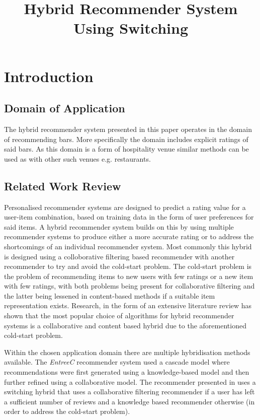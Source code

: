 \documentclass[conference]{IEEEtran}
\begin{document}
\title{Hybrid Recommender System Using Switching}

\author{
}
\maketitle

\section{Introduction}
\subsection{Domain of Application}
The hybrid recommender system presented in this paper operates in the domain of recommending bars. More specifically the domain includes explicit ratings of said bars. As this domain is a form of hospitality venue similar methods can be used as with other such venues e.g. restaurants\cite{b1}.
\subsection{Related Work Review}
Personalised recommender systems are designed to predict a rating value for a user-item combination, based on training data in the form of user preferences for said items\cite{b2}. A hybrid recommender system builds on this by using multiple recommender systems to produce either a more accurate rating or to address the shortcomings of an individual recommender system\cite{b3}. Most commonly this hybrid is designed using a colloborative filtering based recommender with another recommender to try and avoid the cold-start problem\cite{b4}. The cold-start problem is the problem of recommending items to new users with few ratings or a new item with few ratings\cite{b5}, with both problems being present for collaborative filtering and the latter being lessened in content-based methods if a suitable item representation exists\cite{b4}. Research, in the form of an extensive literature review has shown that the most popular choice of algorithms for hybrid recommender systems is a collaborative and content based hybrid due to the aforementioned cold-start problem\cite{b5}. \par Within the chosen application domain there are multiple hybridisation methods available. The \textit{EntreeC} recommender system\cite{b1} used a cascade model where recommendations were first generated using a knowledge-based model and then further refined using a collaborative model. The recommender presented in\cite{b7} uses a switching hybrid that uses a collaborative filtering recommender if a user has left a sufficient number of reviews and a knowledge based recommender otherwise (in order to address the cold-start problem).
\end{document}
